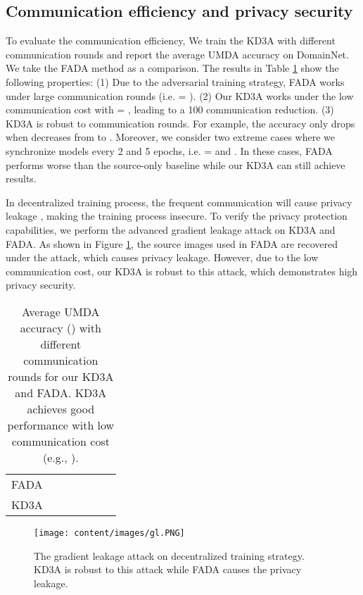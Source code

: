 \documentclass{article}
\begin{document}
\subsection{Communication efficiency and privacy security}
To evaluate the communication efficiency, We train the KD3A with different communication rounds  and report the average UMDA accuracy on DomainNet. We take the FADA method as a comparison. The results in Table \ref{table:robust-to-cr} show the following properties: (1) Due to the adversarial training strategy, FADA works under large communication rounds (i.e.  = ). (2) Our KD3A works under the low communication cost with  = , leading to a 100  communication reduction. (3) KD3A is robust to communication rounds. For example, the accuracy only drops  when  decreases from  to . Moreover, we consider two extreme cases where we synchronize models every 2 and 5 epochs, i.e.  =  and . In these cases, FADA performs worse than the source-only baseline while our KD3A can still achieve  results. 

In decentralized training process, the frequent communication will cause privacy leakage \cite{DBLP:conf/infocom/WangSZSWQ19}, making the training process insecure. To verify the privacy protection capabilities, we perform the advanced gradient leakage attack \citep{DBLP:conf/nips/ZhuLH19} on KD3A and FADA. As shown in Figure \ref{fig:gl}, the source images used in FADA are recovered under the attack, which causes privacy leakage. However, due to the low communication cost, our KD3A is robust to this attack, which demonstrates high privacy security.
\begin{table}[t]
\setlength\extrarowheight{4.5pt}
\begin{tabular}{c|cccccc}
      & & & & & &  \\ \hline
FADA & && &   &      &   \\ \hline
KD3A  &  &  &  &  &      &   \\
\hline
\end{tabular}
\caption{Average UMDA accuracy () with different communication rounds  for our KD3A and FADA. KD3A achieves good performance with low communication cost (e.g., ). }
\label{table:robust-to-cr}
\end{table}
\begin{figure}[t]
\centering
\texttt{[image: content/images/gl.PNG]}
\caption{The gradient leakage attack \citep{DBLP:conf/nips/ZhuLH19} on decentralized training strategy. KD3A is robust to this attack while FADA causes the privacy leakage.}
\label{fig:gl}
\vspace{-0.2cm}
\end{figure}
%
\end{document}
